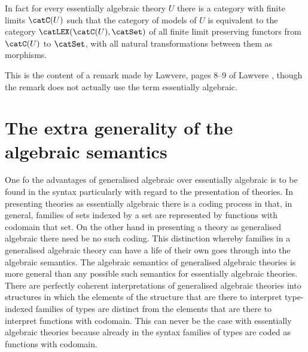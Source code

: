 In fact for every essentially algebraic theory $U$ there is a category with finite limits $\catC(U)$ such that the category of models of $U$ is equivalent to the category $\catLEX(\catC(U),\catSet)$ of all finite limit preserving functors from $\catC(U)$ to $\catSet$, with all natural transformations between them as morphisms.

This is the content of a remark made by Lawvere, pages 8--9 of Lawvere \cite{lawvere:17}, though the remark does not actually use the term essentially algebraic.

\section{The extra generality of the algebraic semantics} \label{sec:source-1-5}
One fo the advantages of generalised algebraic over essentially algebraic is to be found in the syntax particularly with regard to the presentation of theories.
%
In presenting theories as essentially algebraic there is a coding process in that, in general, families of sets indexed by a set are represented by functions with codomain that set.
%
On the other hand in presenting a theory as generalised algebraic there need be no such coding.
%
This distinction whereby families in a generalised algebraic theory can have a life of their own goes through into the algebraic semantics.
%
The algebraic semantics of generalised algebraic theories is more general than any possible such semantics for essentially algebraic theories.
%
There are perfectly coherent interpretations of generalised algebraic theories into structures in which the elements of the structure that are there to interpret type-indexed families of types are distinct from the elements that are there to interpret functions with codomain.
%
This can never be the case with essentially algebraic theories because already in the syntax families of types are coded as functions with codomain.

